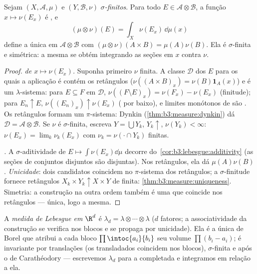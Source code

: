 \begin{theorem}\label{thm:b3:product:existence}
Sejam $(X, \mathcal A, \mu)$ e $(Y, \mathcal B, \nu)$ \emph{$\sigma$-finitos}. Para todo $E \in \mathcal
A\otimes\mathcal B$, a função
$x \mapsto \nu(E_x)$ é , e
\[
(\mu\otimes\nu)(E) = \int_X \nu(E_x)\,\dd\mu(x)
\]
define a única  em $\mathcal A\otimes\mathcal B$ com $(\mu\otimes\nu)(A\times B) = \mu(A)\nu(B)$. Ela é $\sigma$-finita e
simétrica: a mesma  se obtém integrando as seções em $x$ contra
$\nu$.
\end{theorem}

\begin{proof}
\emph{ de $x \mapsto \nu(E_x)$.} Suponha primeiro $\nu$ finita. A
classe $\mathcal D$ dos $E$ para os quais a aplicação é  contém os
retângulos ($\nu((A\times B)_x) =
\nu(B)\mathbf 1_A(x)$) e é um $\lambda$-sistema: para $E
\subseteq F$ em $\mathcal D$, $\nu((F\setminus E)_x) =
\nu(F_x) - \nu(E_x)$
(finitude); para $E_n \uparrow E$, $\nu((E_n)_x) \uparrow \nu(E_x)$ ( por baixo), e limites
monótonos de  são . Os retângulos formam
um $\pi$-sistema: Dynkin (\cref{thm:b3:measure:dynkin}) dá $\mathcal D = \mathcal
A\otimes\mathcal B$. Se $\nu$ é
$\sigma$-finita, escreva $Y =
\bigcup Y_k$, $Y_k \uparrow$, $\nu(Y_k) < \infty$: $\nu(E_x) =
\lim_k\nu_k(E_x)$ com $\nu_k = \nu(\cdot\cap Y_k)$ finitas.

\emph{.} A $\sigma$-aditividade de $E \mapsto
\int\nu(E_x)\dd\mu$ decorre
do~\cref{cor:b3:lebesgue:additivity} (as seções de conjuntos disjuntos são disjuntas). Nos
retângulos, ela dá $\mu(A)\nu(B)$. \emph{Unicidade}: dois candidatos coincidem no
$\pi$-sistema dos retângulos; a $\sigma$-finitude fornece
retângulos $X_k\times
Y_k \uparrow X\times Y$ de  finita: \cref{thm:b3:measure:uniqueness}. Simetria: a construção
na outra ordem também é uma  que coincide nos retângulos ---
única, logo a mesma.
\end{proof}

\begin{definition}\label{def:b3:product:lebesgue}
A \emph{medida de Lebesgue em $\R^d$} é $\lambda_d = \lambda\otimes\cdots\otimes\lambda$ ($d$ fatores; a associatividade da construção se
verifica nos blocos e se propaga por unicidade). Ela é a única 
de Borel que atribui a cada bloco $\prod\intoc{a_i}{b_i}$ seu volume $\prod(b_i - a_i)$; é invariante por
translações (os transladados coincidem nos blocos),
$\sigma$-finita e  após o  de Carathéodory ---
escrevemos $\lambda_d$ para a  completada e integramos em relação a ela.
\end{definition}

